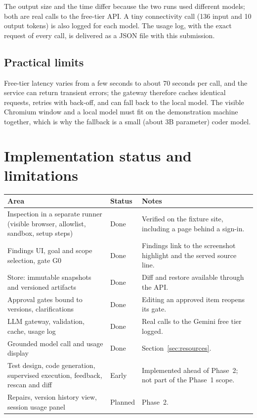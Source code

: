 \documentclass[11pt,a4paper]{article}
\begin{document}
\medskip
The output size and the time differ because the two runs used different models; both are real calls to the free-tier API. A tiny connectivity call (136 input and 10 output tokens) is also logged for each model. The usage log, with the exact request of every call, is delivered as a JSON file with this submission.

\subsection{Practical limits}
Free-tier latency varies from a few seconds to about 70 seconds per call, and the service can return transient errors; the gateway therefore caches identical requests, retries with back-off, and can fall back to the local model. The visible Chromium window and a local model must fit on the demonstration machine together, which is why the fallback is a small (about 3B parameter) coder model.

\section{Implementation status and limitations}
\label{sec:status}
\begin{tabularx}{\linewidth}{@{}L{5.6cm}L{2.2cm}X@{}}
\toprule
\textbf{Area} & \textbf{Status} & \textbf{Notes} \\
\midrule
Inspection in a separate runner (visible browser, allowlist, sandbox, setup steps) & Done & Verified on the fixture site, including a page behind a sign-in. \\
Findings UI, goal and scope selection, gate G0 & Done & Findings link to the screenshot highlight and the served source line. \\
Store: immutable snapshots and versioned artifacts & Done & Diff and restore available through the API. \\
Approval gates bound to versions, clarifications & Done & Editing an approved item reopens its gate. \\
LLM gateway, validation, cache, usage log & Done & Real calls to the Gemini free tier logged. \\
Grounded model call and usage display & Done & Section~\ref{sec:resources}. \\
Test design, code generation, supervised execution, feedback, rescan and diff & Early & Implemented ahead of Phase~2; not part of the Phase~1 scope. \\
Repairs, version history view, session usage panel & Planned & Phase~2. \\
\bottomrule
\end{tabularx}
\end{document}
